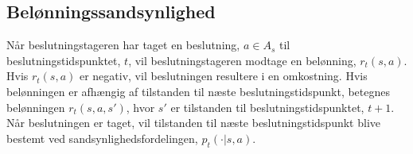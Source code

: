 
\subsection{Belønningssandsynlighed}
Når beslutningstageren har taget en beslutning, $a\in A_{s}$ til beslutningstidspunktet, $t$, vil beslutningstageren modtage en belønning, $r_t(s,a)$. Hvis $r_t(s,a)$ er negativ, vil beslutningen resultere i en omkostning. Hvis belønningen er afhængig af tilstanden til næste beslutningstidspunkt, betegnes belønningen $r_t(s, a, s')$, hvor $s'$ er tilstanden til beslutningstidspunktet, $t+1$.
Når beslutningen er taget, vil tilstanden til næste beslutningstidspunkt blive bestemt ved sandsynlighedsfordelingen, $p_t(\cdot|s,a)$. 





